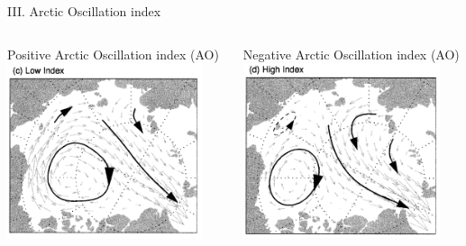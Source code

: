 \documentclass[8pt]{beamer}
\begin{document}
\setwatermark{\fontsize{125pt}{125pt}\selectfont{}}
\begin{frame}[fragile]{III. Arctic Oscillation index}
	\begin{columns}
		Positive Arctic Oscillation index (AO)
		\includegraphics[width=0.9\textwidth]{./img/LowAO_Rigor.PNG}

		Negative Arctic Oscillation index (AO)	\includegraphics[width=0.9\textwidth]{./img/HighAO_Rigor.PNG}
\end{columns}
\end{frame}
\end{document}
